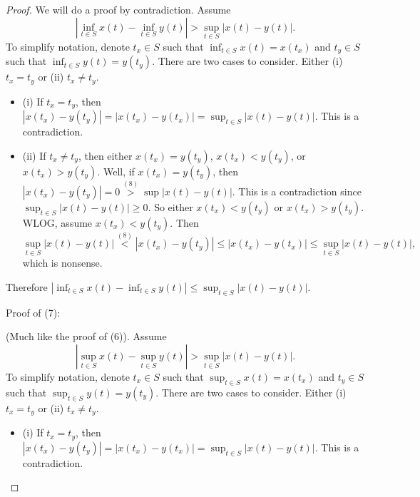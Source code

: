 \documentclass[11pt]{article}
\begin{document}
\begin{itemize}[label={},leftmargin=4mm, itemsep=1em, parsep=1em]
\begin{proof}
    We will do a proof by contradiction. Assume 
    \begin{equation}
      |\inf_{t\in S}x(t) - \inf_{t\in S}y(t)| > \sup_{t\in S}|x(t) -y(t)|.
    \end{equation}
    To simplify notation, denote $t_{x} \in S$ such that $\inf_{t\in
    S}x(t) = x(t_{x})$ and $t_{y} \in S$ such that $\inf_{t\in S}y(t) =
    y(t_{y})$. There are two cases to consider. Either (i) $t_{x} = t_{y}$ or
    (ii) $t_{x} \neq t_{y}$.
    \begin{itemize}[label={},leftmargin=4mm, itemsep=1em, parsep=1em]
      \item (i) If $t_{x} = t_{y}$, then $|x(t_{x}) - y(t_{y})|= |x(t_{x}) -
        y(t_{x})| = \sup_{t\in
        S}|x(t) - y(t)|$. This is a contradiction.

      \item (ii) If $t_{x} \neq t_{y}$, then either $x(t_{x}) = y(t_{y})$,
        $x(t_{x}) < y(t_{y})$, or $x(t_{x}) > y(t_{y})$. Well, if $x(t_{x}) =
        y(t_{y})$, then $|x(t_{x}) - y(t_{y})| = 0 \stackrel{(8)}{>} \sup|x(t) -
        y(t)|$. This is a contradiction since $\sup_{t\in S}|x(t) - y(t)| \geq
        0$. So either $x(t_{x}) < y(t_{y})$ or $x(t_{x}) > y(t_{y})$. WLOG,
        assume $x(t_{x}) < y(t_{y})$. Then 
        \[ \sup_{t\in S}|x(t) - y(t)| \stackrel{(8)}{<} |x(t_{x}) - y(t_{y})|
        \leq |x(t_{x}) - y(t_{x})| \leq \sup_{t\in S}|x(t) - y(t)|, \]
        which is nonsense.
    \end{itemize}
    Therefore $|\inf_{t\in S}x(t) - \inf_{t\in S}y(t)| \leq \sup_{t\in S}|x(t) -
    y(t)|$.

    Proof of (7):

    (Much like the proof of (6)). Assume 
    \begin{equation}
      |\sup_{t\in S}x(t) - \sup_{t\in S}y(t)| > \sup_{t\in S}|x(t) -y(t)|.
    \end{equation}
    To simplify notation, denote $t_{x} \in S$ such that $\sup_{t\in
    S}x(t) = x(t_{x})$ and $t_{y} \in S$ such that $\sup_{t\in S}y(t) =
    y(t_{y})$. There are two cases to consider. Either (i) $t_{x} = t_{y}$ or
    (ii) $t_{x} \neq t_{y}$.
    \begin{itemize}[label={},leftmargin=4mm, itemsep=1em, parsep=1em]
      \item (i) If $t_{x} = t_{y}$, then $|x(t_{x}) - y(t_{y})|= |x(t_{x}) -
        y(t_{x})| = \sup_{t\in
        S}|x(t) - y(t)|$. This is a contradiction.


\end{itemize}
\end{proof}
\end{itemize}
\end{document}
